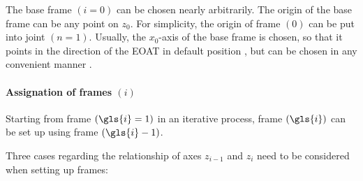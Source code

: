 The base frame $(i=0)$ can be chosen nearly arbitrarily. The origin of the base frame can be any point on $z_0$. For simplicity, the origin of frame $(0)$ can be put into joint $(n=1)$.  Usually, the $x_0$-axis of the base frame is chosen, so that it points in the direction of the \ac{EOAT} in default position \cite{DenavitHartenbergKonventionen}, but can be chosen in any convenient manner \cite{SpongDynContr}.

\paragraph{Assignation of frames $(i)$}

Starting from frame $(\gls{i}=1)$ in an iterative process, frame $(\gls{i})$ can be set up using frame $(\gls{i}-1)$.

Three cases regarding the relationship of axes $z_{i-1}$ and $z_i$  need to be considered when setting up frames:
